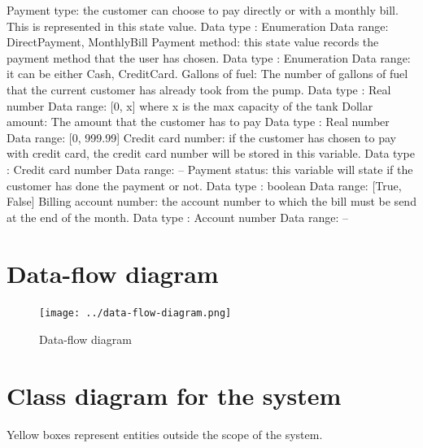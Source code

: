 \documentclass[11pt,a4paper]{article}
\begin{document}
\begin{outline}
	\1 Payment type: the customer can choose to pay directly or with a monthly bill. This is represented in this state value.
		\2 Data type : Enumeration
		\2 Data range: DirectPayment, MonthlyBill
	\1 Payment method: this state value records the payment method that the user has chosen.
		\2 Data type : Enumeration
		\2 Data range: it can be either Cash, CreditCard.
	\1 Gallons of fuel: The number of gallons of fuel that the current customer has already took from the pump.
		\2 Data type : Real number
		\2 Data range: [0, x] where x is the max capacity of the tank
	\1 Dollar amount: The amount that the customer has to pay 
		\2 Data type : Real number
		\2 Data range:  [0, 999.99]
	\1 Credit card number: if the customer has chosen to pay with credit card, the credit card number will be stored in this variable.
		\2 Data type : Credit card number
		\2 Data range: --
	\1 Payment status: this variable will state if the customer has done the payment or not.
		\2 Data type : boolean
		\2 Data range: [True, False]
	\1 Billing account number: the account number to which the bill must be send at the end of the month.
		\2 Data type : Account number
		\2 Data range: --
\end{outline}

\section{Data-flow diagram}

\begin{figure}[H]
 \centering
 \texttt{[image: ../data-flow-diagram.png]} 
 \caption{Data-flow diagram}
 \label{fig:dataflow}
\end{figure}

\newpage

\section{Class diagram for the system}


Yellow boxes represent entities outside the scope of the system.
\end{document}
